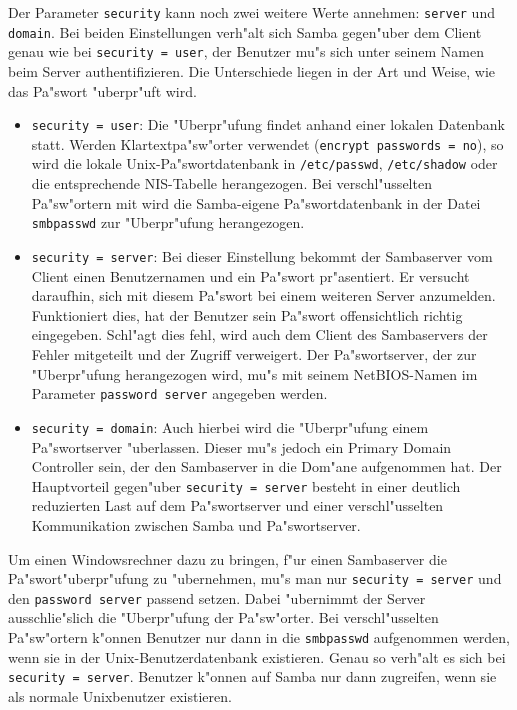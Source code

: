 \documentclass{scrartcl}
\newcommand{\param}{\texttt}
\newcommand{\datei}{\texttt}
\begin{document}
Der Parameter \param{security} kann noch zwei weitere Werte annehmen:
\param{server} und \param{domain}.  Bei beiden Einstellungen verh"alt
sich Samba gegen"uber dem Client genau wie bei \param{security =
  user}, der Benutzer mu"s sich unter seinem Namen beim Server
authentifizieren. Die Unterschiede liegen in der Art und Weise, wie
das Pa"swort "uberpr"uft wird.

\begin{itemize}
\item \param{security = user}: Die "Uberpr"ufung findet anhand einer
  lokalen Datenbank statt. Werden Klartextpa"sw"orter verwendet
  (\param{encrypt passwords = no}), so wird die lokale
  Unix-Pa"swortdatenbank in \datei{/etc/passwd}, \datei{/etc/shadow}
  oder die entsprechende NIS-Tabelle herangezogen. Bei
  verschl"usselten Pa"sw"ortern mit wird die Samba-eigene
  Pa"swortdatenbank in der Datei \datei{smbpasswd} zur "Uberpr"ufung
  herangezogen.
\item \param{security = server}: Bei dieser Einstellung bekommt der
  Sambaserver vom Client einen Benutzernamen und ein Pa"swort
  pr"asentiert. Er versucht daraufhin, sich mit diesem Pa"swort bei
  einem weiteren Server anzumelden. Funktioniert dies, hat der
  Benutzer sein Pa"swort offensichtlich richtig eingegeben.  Schl"agt
  dies fehl, wird auch dem Client des Sambaservers der Fehler
  mitgeteilt und der Zugriff verweigert. Der Pa"swortserver, der zur
  "Uberpr"ufung herangezogen wird, mu"s mit seinem NetBIOS-Namen im
  Parameter \param{password server} angegeben werden.
\item \param{security = domain}: Auch hierbei wird die "Uberpr"ufung
  einem Pa"swortserver "uberlassen. Dieser mu"s jedoch ein Primary
  Domain Controller sein, der den Sambaserver in die Dom"ane
  aufgenommen hat. Der Hauptvorteil gegen"uber \param{security =
    server} besteht in einer deutlich reduzierten Last auf dem
  Pa"swortserver und einer verschl"usselten Kommunikation zwischen
  Samba und Pa"swortserver.
\end{itemize}

Um einen Windowsrechner dazu zu bringen, f"ur einen Sambaserver die
Pa"swort"uberpr"ufung zu "ubernehmen, mu"s man nur \param{security =
  server} und den \param{password server} passend setzen. Dabei
"ubernimmt der Server ausschlie"slich die "Uberpr"ufung der
Pa"s\-w"orter.  Bei verschl"usselten Pa"sw"ortern k"onnen Benutzer nur
dann in die \datei{smbpasswd} aufgenommen werden, wenn sie in der
Unix-Benutzerdatenbank existieren. Genau so verh"alt es sich bei
\param{security = server}. Benutzer k"onnen auf Samba nur dann
zugreifen, wenn sie als normale Unixbenutzer existieren.
\end{document}
